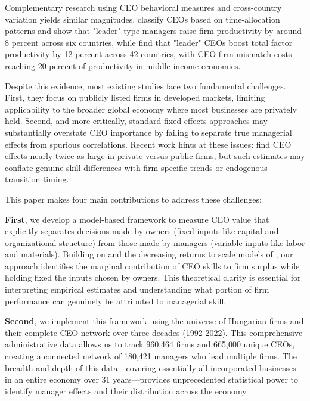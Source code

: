 \documentclass[11pt,a4paper]{article}
\begin{document}
Complementary research using CEO behavioral measures and cross-country variation yields similar magnitudes. \citet{bandiera2020ceo} classify CEOs based on time-allocation patterns and show that "leader"-type managers raise firm productivity by around 8 percent across six countries, while \citet{dahlstrand2025ceo} find that "leader" CEOs boost total factor productivity by 12 percent across 42 countries, with CEO-firm mismatch costs reaching 20 percent of productivity in middle-income economies.

Despite this evidence, most existing studies face two fundamental challenges. First, they focus on publicly listed firms in developed markets, limiting applicability to the broader global economy where most businesses are privately held. Second, and more critically, standard fixed-effects approaches may substantially overstate CEO importance by failing to separate true managerial effects from spurious correlations. Recent work hints at these issues: \citet{quigley2022does} find CEO effects nearly twice as large in private versus public firms, but such estimates may conflate genuine skill differences with firm-specific trends or endogenous transition timing.

This paper makes four main contributions to address these challenges:

\textbf{First}, we develop a model-based framework to measure CEO value that explicitly separates decisions made by owners (fixed inputs like capital and organizational structure) from those made by managers (variable inputs like labor and materials). Building on \citet{Lucas1978-rp} and the decreasing returns to scale models of \citet{AtkesonKehoe2005JPE, McGrattan2012RED}, our approach identifies the marginal contribution of CEO skills to firm surplus while holding fixed the inputs chosen by owners. This theoretical clarity is essential for interpreting empirical estimates and understanding what portion of firm performance can genuinely be attributed to managerial skill.

\textbf{Second}, we implement this framework using the universe of Hungarian firms and their complete CEO network over three decades (1992-2022). This comprehensive administrative data allows us to track 960,464 firms and 665,000 unique CEOs, creating a connected network of 180,421 managers who lead multiple firms. The breadth and depth of this data---covering essentially all incorporated businesses in an entire economy over 31 years---provides unprecedented statistical power to identify manager effects and their distribution across the economy.
\end{document}
